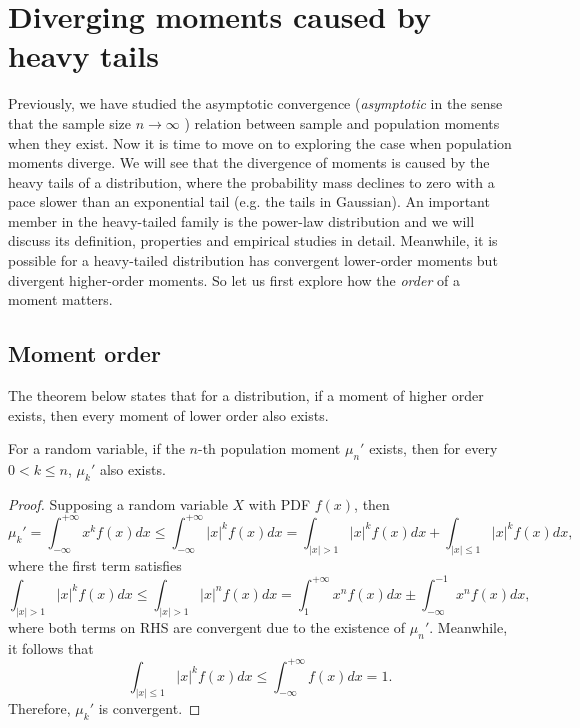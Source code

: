 \section{Diverging moments caused by heavy tails}
Previously, we have studied the asymptotic convergence (\textit{asymptotic} in the sense that the sample size $ n \rightarrow \infty $ ) relation between sample and population moments when they exist. Now it is time to move on to exploring the case when population moments diverge. We will see that the divergence of moments is caused by the heavy tails of a distribution, where the probability mass declines to zero with a pace slower than an exponential tail (e.g. the tails in Gaussian). An important member in the heavy-tailed family is the power-law distribution and we will discuss its definition, properties and empirical studies in detail. Meanwhile, it is possible for a heavy-tailed distribution has convergent lower-order moments but divergent higher-order moments. So let us first explore how the \textit{order} of a moment matters. 

   

\subsection{Moment order}
The theorem below states that for a distribution, if a moment of higher order exists, then every moment of lower order also exists.

\begin{thm}
For a random variable, if the $ n $-th population moment $ \mu_n' $ exists, then  for every $ 0<k \leq n $, $ \mu_k' $ also exists. 
\end{thm}
\begin{proof}
Supposing a random variable $ X $ with PDF $ f(x) $, then
\[ \mu_k' = \int_{-\infty}^{+\infty} x^k f(x) dx \leq \int_{-\infty}^{+\infty} {|x|}^k f(x) dx = \int_{|x|>1} {|x|}^k f(x) dx + \int_{|x|\leq 1} {|x|}^k f(x) dx, \]
where the first term satisfies 
\[ \int_{|x|>1}|x|^k f(x) dx \leq \int_{|x|>1} |x|^n f(x) dx = \int_1^{+\infty} x^n f(x) dx \pm \int_{-\infty}^{-1} x^n f(x) dx, \]
where both terms on RHS are convergent due to the existence of $ \mu_n' $. Meanwhile, it follows that
\[ \int_{|x| \leq 1} |x|^k f(x) dx \leq \int_{-\infty}^{+\infty} f(x) dx = 1. \] Therefore, $ \mu_k' $ is convergent.
\end{proof}

